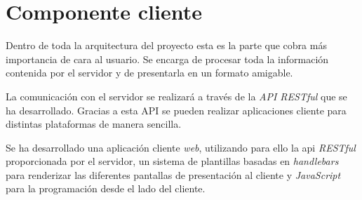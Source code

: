 \section{Componente cliente}

Dentro de toda la arquitectura del proyecto esta es la parte que cobra más importancia de cara al usuario. Se encarga de procesar toda la información contenida por el servidor y de presentarla en un formato amigable.

La comunicación con el servidor se realizará a través de la \emph{API RESTful} que se ha desarrollado. Gracias a esta API se pueden realizar aplicaciones cliente para distintas plataformas de manera sencilla.

Se ha desarrollado una aplicación cliente \emph{web}, utilizando para ello la api \emph{RESTful} proporcionada por el servidor, un sistema de plantillas basadas en \emph{handlebars} para renderizar las diferentes pantallas de presentación al cliente y \emph{JavaScript} para la programación desde el lado del cliente.